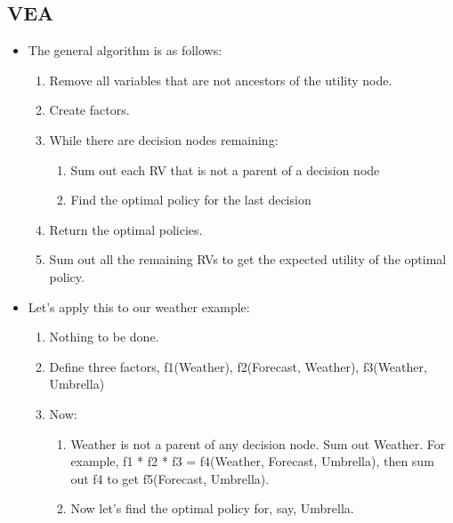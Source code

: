 \documentclass{article}
\begin{document}
\subsection{VEA}
\begin{itemize}
    \item The general algorithm is as follows:
        \begin{enumerate}
            \item Remove all variables that are not ancestors of the utility node.
            \item Create factors.
            \item While there are decision nodes remaining:
                \begin{enumerate}
                    \item Sum out each RV that is not a parent of a decision node
                    \item Find the optimal policy for the last decision
                \end{enumerate}
            \item Return the optimal policies.
            \item Sum out all the remaining RVs to get the expected utility of the optimal policy.
        \end{enumerate}
    \item Let's apply this to our weather example:
        \begin{enumerate}
            \item Nothing to be done.
            \item Define three factors, f1(Weather), f2(Forecast, Weather), f3(Weather, Umbrella)
            \item Now:
                \begin{enumerate}
                    \item Weather is not a parent of any decision node.  Sum out Weather.  For example, f1 * f2 * f3 = f4(Weather, Forecast, Umbrella), then sum out f4 to get f5(Forecast, Umbrella).
                    \item Now let's find the optimal policy for, say, Umbrella.
                \end{enumerate}
        \end{enumerate}
\end{itemize}
\end{document}
